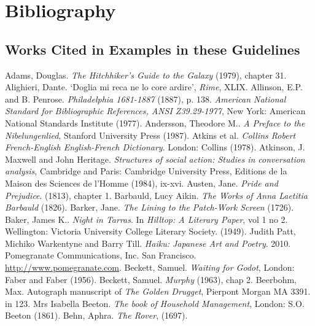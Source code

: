 
\section[{Bibliography}]{Bibliography}\label{BIB}
\subsection[{Works Cited in Examples in these Guidelines}]{Works Cited in Examples in these Guidelines}\begin{bibitemlist}{1}
 Adams, Douglas. \textit{The Hitchhiker's Guide to the Galaxy} (1979), chapter 31.
 Alighieri, Dante. ‘Doglia mi reca ne lo core ardire’, \textit{Rime}, XLIX.
 Allinson, E.P. and B. Penrose. \textit{Philadelphia 1681-1887} (1887), p. 138.
 \textit{American National Standard for Bibliographic References, ANSI Z39.29-1977}, New York: American National Standards Institute (1977).
   Andersson, Theodore M.. \textit{A Preface to the Nibelungenlied}, Stanford University Press (1987).
 Atkins et al.  \textit{Collins Robert French-English English-French Dictionary}. London: Collins (1978).
 Atkinson, J. Maxwell and John Heritage. \textit{Structures of social action: Studies in conversation analysis}, Cambridge and Paris: Cambridge University Press, Editions de la Maison des Sciences de l'Homme (1984), ix-xvi.
 Austen, Jane. \textit{Pride and Prejudice}. (1813), chapter 1.
 Barbauld, Lucy Aikin. \textit{The Works of Anna Laetitia Barbauld} (1826).
 Barker, Jane. \textit{The Lining to the Patch-Work Screen} (1726).
 Baker, James K.. \textit{Night in Tarras}. In \textit{Hilltop: A Literary Paper}, vol 1 no 2. Wellington: Victoria University College Literary Society. (1949).
 Judith Patt, Michiko Warkentyne and Barry Till. \textit{Haiku: Japanese Art and Poetry}. 2010. Pomegranate Communications, Inc. San Francisco. \url{http://www.pomegranate.com}.
 Beckett, Samuel. \textit{Waiting for Godot}, London: Faber and Faber (1956).
 Beckett, Samuel. \textit{Murphy} (1963), chap 2.
 Beerbohm, Max. Autograph manuscript of \textit{The Golden Drugget}, Pierpont Morgan MA 3391. in \cite{KLINKENBORG} 123.
 Mrs Isabella Beeton. \textit{The book of Household Management}, London: S.O. Beeton (1861).
 Behn, Aphra. \textit{The Rover}, (1697).

\end{bibitemlist}
